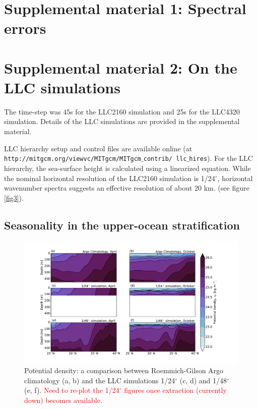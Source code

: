 \documentclass[grl]{agutex2015}
\begin{document}
\begin{article}
\clearpage

\appendix

\section{Supplemental material 1: Spectral errors}

\section{Supplemental material 2: On the LLC simulations}

The time-step was 45s for
the LLC2160 simulation and 25s for the LLC4320 simulation. Details of the LLC simulations
are provided in the supplemental material.

 LLC hierarchy setup
and control files are available online
(at \texttt{http://mitgcm.org/viewvc/MITgcm/MITgcm$\_$contrib/
llc$\_$hires}). For the LLC hierarchy, the sea-surface height is calculated
using a linearized equation. While the nominal horizontal resolution  of the
LLC2160 simulation is 1/24$^\circ$,
 horizontal wavenumber spectra suggests an effective resolution of about 20 km.
 (see figure \ref{fig3}).


\subsection{Seasonality in the upper-ocean stratification}

\begin{figure}[ht]
   \begin{center}
     \includegraphics[width=1.\textwidth]{figs/fig_s2_1.pdf}
  \caption{Potential density: a comparison between Roemmich-Gilson Argo
          climatology (a, b) and the LLC simulations 1/24$^\circ$ (c, d)
          and  1/48$^\circ$ (e, f). \textcolor{red}{Need to re-plot  the 1/24$^\circ$
          figures once extraction (currently down) becomes available}.}
  \label{figS2_1}
  \end{center}
\end{figure}


\end{article}
\end{document}
